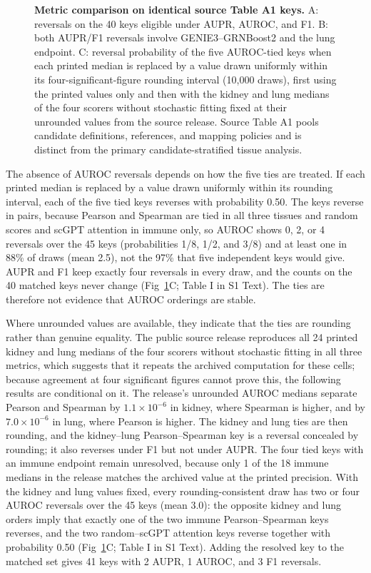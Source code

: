 \documentclass[10pt,letterpaper]{article}
\begin{document}
\begin{figure}[!ht]
\caption{{\bf Metric comparison on identical source Table A1 keys.} A: reversals on the 40 keys eligible under AUPR, AUROC, and F1. B: both AUPR/F1 reversals involve GENIE3--GRNBoost2 and the lung endpoint. C: reversal probability of the five AUROC-tied keys when each printed median is replaced by a value drawn uniformly within its four-significant-figure rounding interval (10{,}000 draws), first using the printed values only and then with the kidney and lung medians of the four scorers without stochastic fitting fixed at their unrounded values from the source release. Source Table A1 pools candidate definitions, references, and mapping policies and is distinct from the primary candidate-stratified tissue analysis.}
\label{fig:metric}
\end{figure}

The absence of AUROC reversals depends on how the five ties are treated. If each printed median is replaced by a value drawn uniformly within its rounding interval, each of the five tied keys reverses with probability 0.50. The keys reverse in pairs, because Pearson and Spearman are tied in all three tissues and random scores and scGPT attention in immune only, so AUROC shows 0, 2, or 4 reversals over the 45 keys (probabilities 1/8, 1/2, and 3/8) and at least one in 88\% of draws (mean 2.5), not the 97\% that five independent keys would give. AUPR and F1 keep exactly four reversals in every draw, and the counts on the 40 matched keys never change (Fig~\ref{fig:metric}C; Table I in S1 Text). The ties are therefore not evidence that AUROC orderings are stable.

Where unrounded values are available, they indicate that the ties are rounding rather than genuine equality. The public source release reproduces all 24 printed kidney and lung medians of the four scorers without stochastic fitting in all three metrics, which suggests that it repeats the archived computation for these cells; because agreement at four significant figures cannot prove this, the following results are conditional on it. The release's unrounded AUROC medians separate Pearson and Spearman by $1.1\times10^{-6}$ in kidney, where Spearman is higher, and by $7.0\times10^{-6}$ in lung, where Pearson is higher. The kidney and lung ties are then rounding, and the kidney--lung Pearson--Spearman key is a reversal concealed by rounding; it also reverses under F1 but not under AUPR. The four tied keys with an immune endpoint remain unresolved, because only 1 of the 18 immune medians in the release matches the archived value at the printed precision. With the kidney and lung values fixed, every rounding-consistent draw has two or four AUROC reversals over the 45 keys (mean 3.0): the opposite kidney and lung orders imply that exactly one of the two immune Pearson--Spearman keys reverses, and the two random--scGPT attention keys reverse together with probability 0.50 (Fig~\ref{fig:metric}C; Table I in S1 Text). Adding the resolved key to the matched set gives 41 keys with 2 AUPR, 1 AUROC, and 3 F1 reversals.
\end{document}
